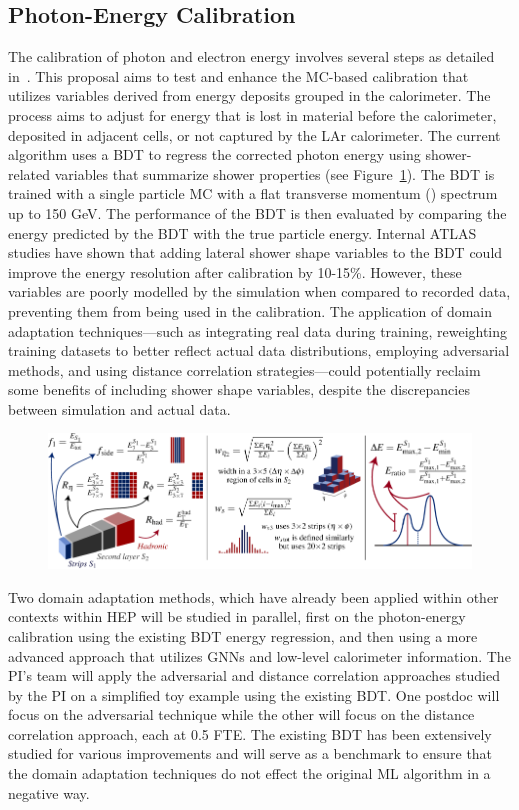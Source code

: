 \documentclass[letter, USenglish, 11pt, subfigure]{article}
\begin{document}
\subsection{Photon-Energy Calibration}

The calibration of photon and electron energy involves several steps as detailed in~\cite{atlascollaboration2023electron}. This proposal aims to test and enhance the MC-based calibration that utilizes variables derived from energy deposits grouped in the calorimeter. The process aims to adjust for energy that is lost in material before the calorimeter, deposited in adjacent cells, or not captured by the LAr calorimeter. The current algorithm uses a BDT to regress the corrected photon energy using shower-related variables that summarize shower properties (see Figure~\ref{fig:showerVars}). The BDT is trained with a single particle MC with a flat transverse momentum (\pt) spectrum up to 150 GeV. The performance of the BDT is then evaluated by comparing the energy predicted by the BDT with the true particle energy. Internal ATLAS studies have shown that adding lateral shower shape variables to the BDT could improve the energy resolution after calibration by 10-15\%. However, these variables are poorly modelled by the simulation when compared to recorded data, preventing them from being used in the calibration. The application of domain adaptation techniques—such as integrating real data during training, reweighting training datasets to better reflect actual data distributions, employing adversarial methods, and using distance correlation strategies—could potentially reclaim some benefits of including shower shape variables, despite the discrepancies between simulation and actual data.

\begin{figure}[ht]
  \centering
  \includegraphics[width=\textwidth]{figures/photon_ID_variables.pdf}
  \caption{\label{fig:showerVars} }
\end{figure}

Two domain adaptation methods, which have already been applied within other contexts within HEP will be studied in parallel, first on the photon-energy calibration using the existing BDT energy regression, and then using a more advanced approach that utilizes GNNs and low-level calorimeter information. The PI's team will apply the adversarial and distance correlation approaches studied by the PI on a simplified toy example using the existing BDT. One postdoc will focus on the adversarial technique while the other will focus on the distance correlation approach, each at 0.5 FTE. The existing BDT has been extensively studied for various improvements and will serve as a benchmark to ensure that the domain adaptation techniques do not effect the original ML algorithm in a negative way.
\end{document}
